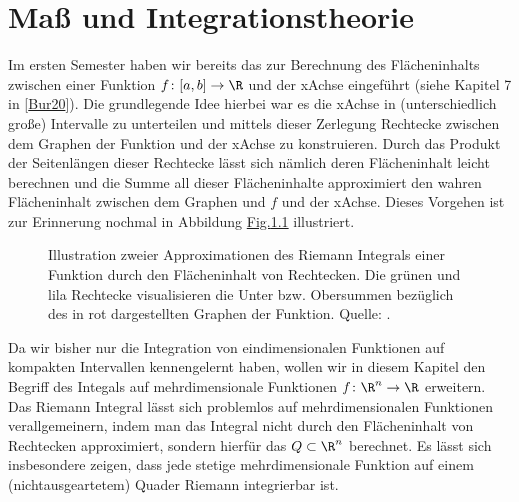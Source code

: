 \documentclass[letterpaper,10pt,english]{jupyterBook}
\let\sphinxpxdimen\pdfpxdimen\else\newdimen\sphinxpxdimen
\begin{document}
\chapter{Maß\sphinxhyphen{} und Integrationstheorie}
\label{\detokenize{masstheorie/intro_masstheorie:masz-und-integrationstheorie}}\label{\detokenize{masstheorie/intro_masstheorie::doc}}
\sphinxAtStartPar
Im ersten Semester haben wir bereits das  zur Berechnung des Flächeninhalts zwischen einer Funktion \(f \colon [a,b] \rightarrow \R\) und der x\sphinxhyphen{}Achse eingeführt (siehe Kapitel 7 in {[}\hyperlink{cite.references:id2}{Bur20}{]}).
Die grundlegende Idee hierbei war es die x\sphinxhyphen{}Achse in (unterschiedlich große) Intervalle zu unterteilen und mittels dieser Zerlegung Rechtecke zwischen dem Graphen der Funktion und der x\sphinxhyphen{}Achse zu konstruieren.
Durch das Produkt der Seitenlängen dieser Rechtecke lässt sich nämlich deren Flächeninhalt leicht berechnen und die Summe all dieser Flächeninhalte approximiert den wahren Flächeninhalt zwischen dem Graphen und \(f\) und der x\sphinxhyphen{}Achse.
Dieses Vorgehen ist zur Erinnerung nochmal in Abbildung \hyperref[\detokenize{masstheorie/intro_masstheorie:fig-riemann-integral}]{Fig.\@ \ref{\detokenize{masstheorie/intro_masstheorie:fig-riemann-integral}}} illustriert.

\begin{figure}[htbp]
\centering
\capstart

\noindent\sphinxincludegraphics[height=300\sphinxpxdimen]{{ober_untersummen}.png}
\caption{Illustration zweier Approximationen des Riemann Integrals einer Funktion durch den Flächeninhalt von Rechtecken. Die grünen und lila Rechtecke visualisieren die Unter\sphinxhyphen{} bzw. Obersummen bezüglich des in rot dargestellten Graphen der Funktion. Quelle: .}\label{\detokenize{masstheorie/intro_masstheorie:fig-riemann-integral}}\end{figure}

\sphinxAtStartPar
Da wir bisher nur die Integration von eindimensionalen Funktionen auf kompakten Intervallen kennengelernt haben, wollen wir in diesem Kapitel den Begriff des Integals auf mehrdimensionale Funktionen \(f \colon \R^n \rightarrow \R\) erweitern.
Das Riemann Integral lässt sich problemlos auf mehrdimensionalen Funktionen verallgemeinern, indem man das Integral nicht durch den Flächeninhalt von Rechtecken approximiert, sondern hierfür das  \(Q \subset \R^n\) berechnet.
Es lässt sich insbesondere zeigen, dass jede stetige mehrdimensionale Funktion auf einem (nicht\sphinxhyphen{}ausgeartetem) Quader Riemann integrierbar ist.
\end{document}
